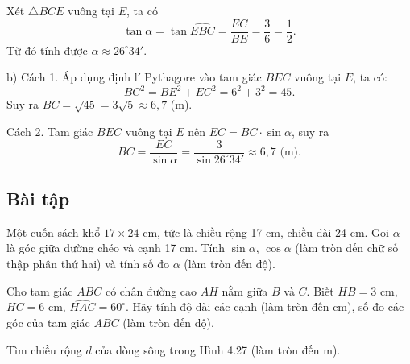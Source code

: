 \begin{lesson}
    Xét $\triangle BCE$ vuông tại $E$, ta có
    \[
        \tan\alpha=\tan\widehat{EBC}=\dfrac{EC}{BE}=\dfrac{3}{6}=\dfrac{1}{2}.
    \]
    Từ đó tính được $\alpha\approx26^\circ34'$.

    b) Cách 1. Áp dụng định lí Pythagore vào tam giác $BEC$ vuông tại $E$, ta có:
    \[
        BC^2=BE^2+EC^2=6^2+3^2=45.
    \]
    Suy ra $BC=\sqrt{45}=3\sqrt{5}\approx6{,}7$ (m).

    Cách 2. Tam giác $BEC$ vuông tại $E$ nên $EC=BC\cdot\sin\alpha$,
    suy ra
    \[
        BC=\dfrac{EC}{\sin\alpha}=\dfrac{3}{\sin26^\circ34'}\approx6{,}7\text{ (m)}.
    \]
\end{lesson}

\begin{exercises}
    \subsection{Bài tập}

    \begin{questions}[resume=SGK]
        \item Một cuốn sách khổ $17\times24$ cm, tức là chiều rộng 17 cm, chiều dài 24 cm. Gọi $\alpha$ là góc giữa đường chéo và cạnh 17 cm. Tính $\sin\alpha$, $\cos\alpha$ (làm tròn đến chữ số thập phân thứ hai) và tính số đo $\alpha$ (làm tròn đến độ).

        \answerline
        \answerline
        \answerline

        \item Cho tam giác $ABC$ có chân đường cao $AH$ nằm giữa $B$ và $C$. Biết $HB=3$ cm, $HC=6$ cm, $\widehat{HAC}=60^\circ$. Hãy tính độ dài các cạnh (làm tròn đến cm), số đo các góc của tam giác $ABC$ (làm tròn đến độ).

        \answerline
        \answerline
        \answerline
        \answerline

        \item Tìm chiều rộng $d$ của dòng sông trong Hình 4.27 (làm tròn đến m).

        \begin{center}


\end{center}
\end{questions}
\end{exercises}
